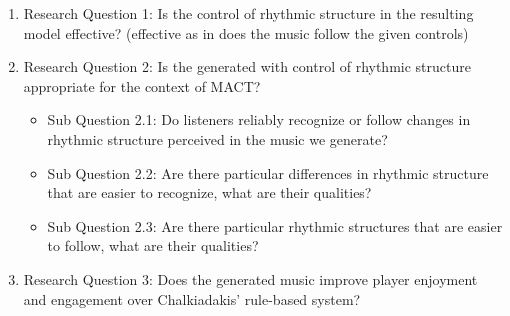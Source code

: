 \begin{enumerate}
\item{Research Question 1}: Is the control of rhythmic structure in the resulting model effective? (effective as in does the music follow the given controls)
\item{Research Question 2}: Is the generated with control of rhythmic structure appropriate for the context of MACT?
\begin{itemize}
\item{Sub Question 2.1}: Do listeners reliably recognize or follow changes in rhythmic structure perceived in the music we generate?
\item{Sub Question 2.2}: Are there particular differences in rhythmic structure that are easier to recognize, what are their qualities?
\item{Sub Question 2.3}: Are there particular rhythmic structures that are easier to follow, what are their qualities? 
\end{itemize}
\item {Research Question 3}: Does the generated music improve player enjoyment and engagement over Chalkiadakis' \cite{Chalkiadakis_2022} rule-based system? 
\end{enumerate}
